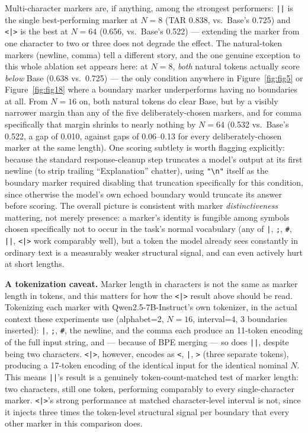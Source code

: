 \documentclass[11pt]{article}
\begin{document}
Multi-character markers are, if anything, among the strongest performers: \texttt{||} is the single best-performing marker at $N=8$ (TAR 0.838, vs.\ Base's 0.725) and \texttt{<|>} is the best at $N=64$ (0.656, vs.\ Base's 0.522) --- extending the marker from one character to two or three does not degrade the effect. The natural-token markers (newline, comma) tell a different story, and the one genuine exception to this whole ablation set appears here: at $N=8$, \emph{both} natural tokens actually score \emph{below} Base (0.638 vs.\ 0.725) --- the only condition anywhere in Figure~\ref{fig:fig5} or Figure~\ref{fig:fig18} where a boundary marker underperforms having no boundaries at all. From $N=16$ on, both natural tokens do clear Base, but by a visibly narrower margin than any of the five deliberately-chosen markers, and for comma specifically that margin shrinks to nearly nothing by $N=64$ (0.532 vs.\ Base's 0.522, a gap of 0.010, against gaps of 0.06--0.13 for every deliberately-chosen marker at the same length). One scoring subtlety is worth flagging explicitly: because the standard response-cleanup step truncates a model's output at its first newline (to strip trailing ``Explanation'' chatter), using \texttt{"\textbackslash n"} itself as the boundary marker required disabling that truncation specifically for this condition, since otherwise the model's own echoed boundary would truncate its answer before scoring. The overall picture is consistent with marker \emph{distinctiveness} mattering, not merely presence: a marker's identity is fungible among symbols chosen specifically not to occur in the task's normal vocabulary (any of \texttt{|}, \texttt{;}, \texttt{\#}, \texttt{||}, \texttt{<|>} work comparably well), but a token the model already sees constantly in ordinary text is a measurably weaker structural signal, and can even actively hurt at short lengths.

\textbf{A tokenization caveat.} Marker length in characters is not the same as marker length in tokens, and this matters for how the \texttt{<|>} result above should be read. Tokenizing each marker with Qwen2.5-7B-Instruct's own tokenizer, in the actual context these experiments use (alphabet=2, $N=16$, interval=4, 3 boundaries inserted): \texttt{|}, \texttt{;}, \texttt{\#}, the newline, and the comma each produce an 11-token encoding of the full input string, and --- because of BPE merging --- so does \texttt{||}, despite being two characters. \texttt{<|>}, however, encodes as \texttt{<}, \texttt{|}, \texttt{>} (three separate tokens), producing a 17-token encoding of the identical input for the identical nominal $N$. This means \texttt{||}'s result is a genuinely token-count-matched test of marker length: two characters, still one token, performing comparably to every single-character marker. \texttt{<|>}'s strong performance at matched character-level interval is not, since it injects three times the token-level structural signal per boundary that every other marker in this comparison does.
\end{document}
